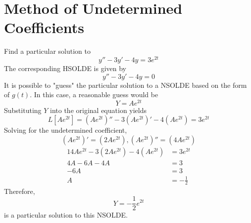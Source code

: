 \documentclass[twoside]{report}
\begin{document}
    \section{Method of Undetermined Coefficients}
    \begin{example}
        Find a particular solution to
        \begin{equation}
            y''-3y'-4y=3e^{2t}
        \end{equation}
        The corresponding HSOLDE is given by
        \begin{equation}
            y'' - 3y' -4y = 0
        \end{equation}
        It is possible to "guess" the particular solution to a NSOLDE based on the form of $g(t)$. In this case, a reasonable guess would be
        \begin{equation}
            Y = Ae^{2t}
        \end{equation}
        Substituting $Y$ into the original equation yields
        \begin{equation}
            L[Ae^{2t}] = (Ae^{2t})'' - 3(Ae^{2t})' - 4(Ae^{2t}) = 3e^{2t}
        \end{equation}
        Solving for the undetermined coefficient,
        \begin{equation}
            (Ae^{2t})' = (2Ae^{2t}), (Ae^{2t})'' = (4Ae^{2t})
        \end{equation}
        \begin{alignat}{1}
            4Ae^{2t} - 3(2Ae^{2t}) - 4(Ae^{2t}) &= 3e^{2t}\\
            4A - 6A - 4A &= 3\\
            -6A &= 3\\
            A &= -\frac{1}{2}
        \end{alignat}
        Therefore,
        \begin{equation}
            Y = -\frac{1}{2}e^{2t}
        \end{equation}
        is a particular solution to this NSOLDE.
    \end{example}
    \np
\end{document}
